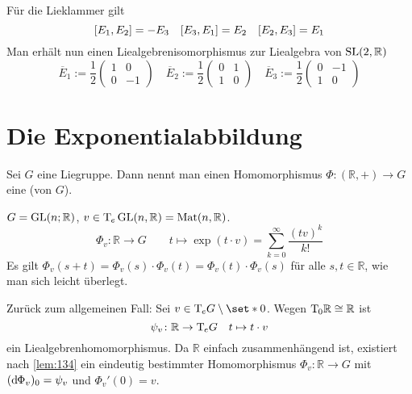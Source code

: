 \begin{beispiel*}[{name=[Überlagerung der speziellen linearen Gruppe]}]
\[	\]
	Für die Lieklammer gilt
	\[
		\benbrace*{E_1,E_2} = - E_3 \quad \benbrace*{E_3,E_1} = E_2 \quad \benbrace*{E_2,E_3} =E_1
	\]
	Man erhält nun einen Liealgebrenisomorphismus zur Liealgebra von $\operatorname{SL}(2,\mathbb{R})$ 
	\[
		\overline{E}_1 := \frac{1}{2} \begin{pmatrix}
			1 & 0 \\ 0 & -1
		\end{pmatrix} \quad 
		\overline{E}_2 := \frac{1}{2}  \begin{pmatrix}
			0 & 1 \\ 1 & 0
		\end{pmatrix} \quad 
		\overline{E}_3 := \frac{1}{2} \begin{pmatrix}
			0 & -1 \\ 1 & 0
		\end{pmatrix} 
	\]
\end{beispiel*}

\section{Die Exponentialabbildung} %
\label{sec:14}

\begin{definition}[{name=[{Einparameteruntergruppe}]}]
	Sei $G$ eine Liegruppe.
	Dann nennt man einen Homomorphismus $\Phi \colon (\mathbb{R},+) \to G$ eine  (von $G$).
\end{definition}

\begin{beispiel*}[{name=[Einparametergruppe der allgemeinen linearen Gruppe]}]
	$G = \operatorname{GL}(n;\mathbb{R})$, $v \in \mathrm{T}\mkern-0.85mu_e \operatorname{GL}(n,\mathbb{R}) = \operatorname{Mat}(n,\mathbb{R})$.
	\[
		\Phi_v \colon \mathbb{R} \longrightarrow G \qquad t \longmapsto \exp(t \cdot v) = \sum_{k=0}^{\infty}  \frac{(tv)^k}{k!} 
	\]
	Es gilt $\Phi_v(s+t) = \Phi_v(s) \cdot \Phi_v(t) = \Phi_v(t) \cdot \Phi_v(s)$ für alle $s,t \in \mathbb{R}$, wie man sich leicht überlegt.
\end{beispiel*}

Zurück zum allgemeinen Fall: Sei $v \in \Tmap_e G \setminus \set*{0}$.
Wegen $\mathrm{T}\mkern-0.85mu_0 \mathbb{R} \cong \mathbb{R}$ ist
\[
	\psi_v \colon \mathbb{R} \to \mathrm{T}\mkern-0.85mu_e G \quad t \mapsto t \cdot v
\]
ein Liealgebrenhomomorphismus.
Da $\mathbb{R}$ einfach zusammenhängend ist, existiert nach \autoref{lem:134} ein eindeutig bestimmter Homomorphismus
\(
	\Phi_v \colon \mathbb{R} \to G
\)
mit $(\mathrm{d}\mkern-1.0mu \Phi_v)_0 = \psi_v$ und $\Phi_v'(0)= v$.


